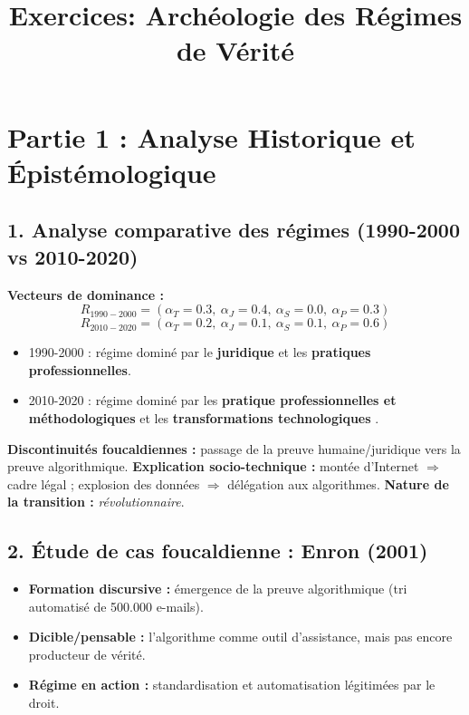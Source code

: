 \documentclass[12pt,a4paper]{article}
\title{ Exercices: 	\textbf{Archéologie des Régimes de Vérité }}
\date{}
\begin{document}
	\maketitle
	
	\section*{Partie 1 : Analyse Historique et Épistémologique}
	
	\subsection*{1. Analyse comparative des régimes (1990-2000 vs 2010-2020)}
	
	\textbf{Vecteurs de dominance :}
	\[
	R_{1990-2000} = (\alpha_T=0.3,\ \alpha_J=0.4,\ \alpha_S=0.0,\ \alpha_P=0.3)
	\]
	\[
	R_{2010-2020} = (\alpha_T=0.2,\ \alpha_J=0.1,\ \alpha_S=0.1,\ \alpha_P=0.6)
	\]
	
	\begin{itemize}
		\item 1990-2000 : régime dominé par le \textbf{juridique} et les \textbf{pratiques professionnelles}.
		\item 2010-2020 : régime dominé par les \textbf{pratique professionnelles et méthodologiques} et les\textbf{ transformations technologiques} .
	\end{itemize}
	
	\textbf{Discontinuités foucaldiennes :} passage de la preuve humaine/juridique vers la preuve algorithmique.  
	\textbf{Explication socio-technique :} montée d’Internet $\Rightarrow$ cadre légal ; explosion des données $\Rightarrow$ délégation aux algorithmes.  
	\textbf{Nature de la transition :} \textit{révolutionnaire}.  
	
	\subsection*{2. Étude de cas foucaldienne : Enron (2001)}
	
	\begin{itemize}
		\item \textbf{Formation discursive :} émergence de la preuve algorithmique (tri automatisé de 500.000 e-mails).
		\item \textbf{Dicible/pensable :} l’algorithme comme outil d’assistance, mais pas encore producteur de vérité.
		\item \textbf{Régime en action :} standardisation et automatisation légitimées par le droit.
	\end{itemize}
	
\end{document}
